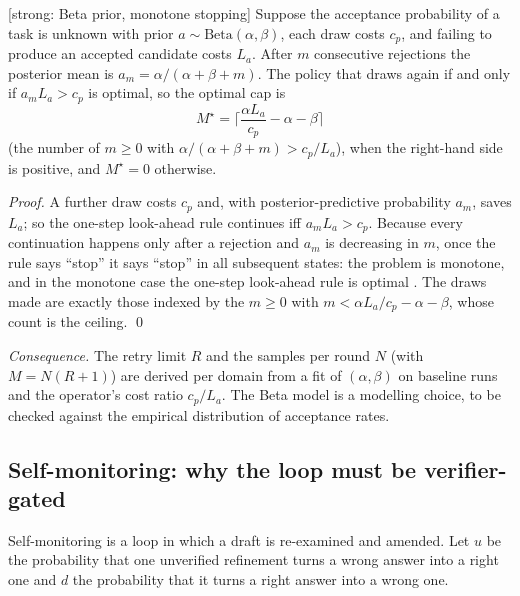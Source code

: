 \begin{proposition}
\textnormal{[strong: Beta prior, monotone stopping]}
\label{prop:stopping}
Suppose the acceptance probability of a task is unknown with prior
$a\sim\mathrm{Beta}(\alpha,\beta)$, each draw costs $c_p$, and failing to
produce an accepted candidate costs $L_a$. After $m$ consecutive rejections the
posterior mean is $a_m=\alpha/(\alpha+\beta+m)$. The policy that draws again if
and only if $a_m L_a>c_p$ is optimal, so the optimal cap is
\begin{equation}
M^\star=\Big\lceil\frac{\alpha L_a}{c_p}-\alpha-\beta\Big\rceil
\end{equation}
(the number of $m\ge0$ with $\alpha/(\alpha+\beta+m)>c_p/L_a$),
when the right-hand side is positive, and $M^\star=0$ otherwise.
\end{proposition}
\begin{proof}
A further draw costs $c_p$ and, with posterior-predictive probability $a_m$,
saves $L_a$; so the one-step look-ahead rule continues iff $a_mL_a>c_p$.
Because every continuation happens only after a rejection and $a_m$ is
decreasing in $m$, once the rule says ``stop'' it says ``stop'' in all
subsequent states: the problem is monotone, and in the monotone case the
one-step look-ahead rule is optimal \cite{chow1971great}. The draws made are exactly those indexed by the $m\ge0$ with
$m<\alpha L_a/c_p-\alpha-\beta$, whose count is the ceiling. \qed
\end{proof}
\emph{Consequence.} The retry limit $R$ and the samples per round $N$
(with $M=N(R{+}1)$) are derived per domain from a fit of
$(\alpha,\beta)$ on baseline runs and the operator's cost ratio $c_p/L_a$. The
Beta model is a modelling choice, to be checked against the empirical
distribution of acceptance rates.

\subsection{Self-monitoring: why the loop must be verifier-gated}

Self-monitoring is a loop in which a draft is re-examined and amended. Let $u$ be the probability that one unverified
refinement turns a wrong answer into a right one and $d$ the probability that
it turns a right answer into a wrong one.

